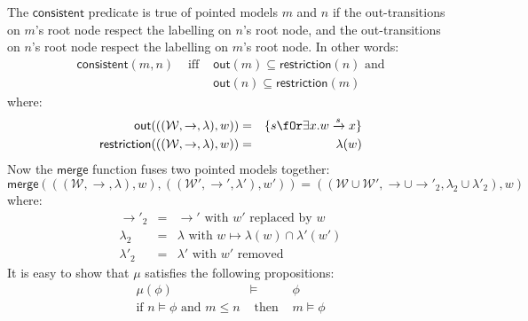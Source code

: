 \noindent The $\mathsf{consistent}$ predicate is true of pointed models $m$ and $n$ if the out-transitions on $m$'s root node respect the labelling on $n$'s root node, and the out-transitions on $n$'s root node respect the labelling on $m$'s root node. In other words:
\begin{eqnarray}
\mathsf{consistent}(m, n) & \mbox{ iff } & \mathsf{out}(m) \subseteq \mathsf{restriction}(n) \mbox{ and} \nonumber \\
& & \mathsf{out}(n) \subseteq \mathsf{restriction}(m) \nonumber
\end{eqnarray}
where:
\begin{eqnarray}
\mathsf{out}(((\mathcal{W},\rightarrow,\lambda),w)) & = & \{ s \fOr \exists x . w \xrightarrow{s} x \} \nonumber \\
\mathsf{restriction}(((\mathcal{W},\rightarrow,\lambda),w)) & = & \lambda(w) \nonumber
\end{eqnarray}
Now the $\mathsf{merge}$ function fuses two pointed models together:
\[
\mathsf{merge}( ( (\mathcal{W}, \rightarrow, \lambda), w),  ( (\mathcal{W}', \rightarrow', \lambda'), w')) = ((\mathcal{W} \cup \mathcal{W}', \rightarrow \cup \rightarrow'_2, \lambda_2 \cup \lambda'_2), w)
\]
where:
\begin{eqnarray}
\rightarrow'_2 & = & \rightarrow' \mbox{ with } w' \mbox{ replaced by } w \nonumber \\
\lambda_2 & = & \lambda \mbox{ with } w \mapsto \lambda(w) \cap \lambda'(w') \nonumber \\
\lambda'_2 & = & \lambda' \mbox{ with } w' \mbox{ removed } \nonumber
\end{eqnarray}
It is easy to show that $\mu$ satisfies the following propositions:
\begin{eqnarray}
\mu(\phi) & \models & \phi \nonumber \\
\mbox{if }n \models \phi \mbox{ and } m \leq n & \mbox{ then } & m \models \phi \nonumber
\end{eqnarray}
